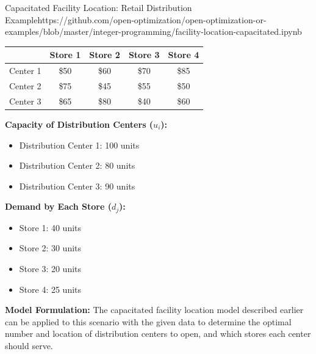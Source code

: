 \begin{examplewithcode}{Capacitated Facility Location: Retail Distribution Example}{https://github.com/open-optimization/open-optimization-or-examples/blob/master/integer-programming/facility-location-capacitated.ipynb}
\begin{center}
\begin{tabular}{l|cccc}
\toprule
& Store 1 & Store 2 & Store 3 & Store 4 \\
\midrule
Center 1 & \$50 & \$60 & \$70 & \$85 \\
Center 2 & \$75 & \$45 & \$55 & \$50 \\
Center 3 & \$65 & \$80 & \$40 & \$60 \\
\bottomrule
\end{tabular}
\end{center}

\noindent\textbf{Capacity of Distribution Centers ($u_i$):}
\begin{itemize}
    \item Distribution Center 1: 100 units
    \item Distribution Center 2: 80 units
    \item Distribution Center 3: 90 units
\end{itemize}

\noindent\textbf{Demand by Each Store ($d_j$):}
\begin{itemize}
    \item Store 1: 40 units
    \item Store 2: 30 units
    \item Store 3: 20 units
    \item Store 4: 25 units
\end{itemize}

\textbf*{Model Formulation:}
The capacitated facility location model described earlier can be applied to this scenario with the given data to determine the optimal number and location of distribution centers to open, and which stores each center should serve.
\end{examplewithcode}



